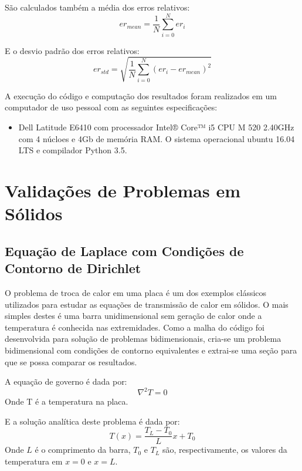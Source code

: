 São calculados também a média dos erros relativos:
\begin{equation}
    er_{mean} = \frac{1}{N}\sum_{i=0}^{N} er_i
    \label{error_mean}
\end{equation}

E o desvio padrão dos erros relativos:
\begin{equation}
    er_{std} = \sqrt{\frac{1}{N}\sum_{i=0}^{N} (er_i-er_{mean})^2}
    \label{error_std} 
\end{equation}

A execução do código e computação dos resultados foram realizados em um computador de uso pessoal com as seguintes especificações:
\begin{itemize}
    \item Dell Latitude E6410 com processador Intel® Core™ i5 CPU M 520 2.40GHz com 4 núcloes e 4Gb de memória RAM.
          O sistema operacional ubuntu 16.04 LTS e compilador Python 3.5.
\end{itemize}

\section{\textbf{Validações de Problemas em Sólidos}}
\subsection{\textbf{Equação de Laplace com Condições de Contorno de Dirichlet}}
O problema de troca de calor em uma placa é um dos exemplos clássicos utilizados para estudar as equações de transmissão de calor em sólidos. O mais simples destes é uma barra unidimensional sem geração de calor onde a temperatura é conhecida nas extremidades.
Como a malha do código foi desenvolvida para solução de problemas bidimensionais, cria-se um problema bidimensional com condições de contorno equivalentes e extrai-se uma seção para que se possa comparar os resultados.

A equação de governo é dada por:
\begin{equation}
    \nabla^2 T = 0
    \label{laplace_d_perm_eq} 
\end{equation}
Onde T é a temperatura na placa.

E a solução analítica deste problema é dada por:
\begin{equation}
    T(x) = \dfrac{T_L-T_0}{L} x + T_0
    \label{laplace_d_sol}
\end{equation}
Onde $L$ é o comprimento da barra, $T_0$ e $T_L$ são, respectivamente, os valores da temperatura em $x=0$ e $x=L$.

